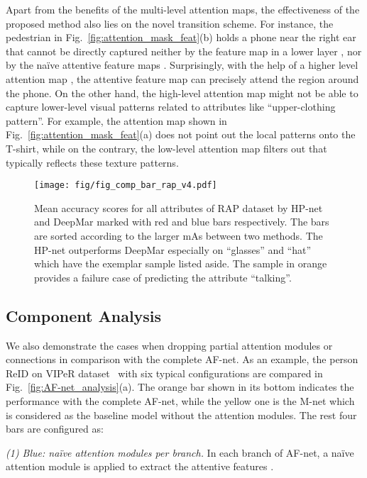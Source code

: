 \documentclass[10pt,twocolumn,letterpaper]{article}
\begin{document}
Apart from the benefits of the multi-level attention maps, the effectiveness of the proposed method also lies on the novel transition scheme.
For instance, the pedestrian in Fig.~\ref{fig:attention_mask_feat}(b) holds a phone near the right ear that cannot be directly captured neither by the feature map  in a lower layer , nor by the na\"ive attentive feature maps .
Surprisingly, with the help of a higher level attention map , the attentive feature map  can precisely attend the region around the phone.
On the other hand, the high-level attention map  might not be able to capture lower-level visual patterns related to attributes like ``upper-clothing pattern''.
For example, the attention map  shown in Fig.~\ref{fig:attention_mask_feat}(a) does not point out the local patterns onto the T-shirt, while on the contrary, the low-level attention map  filters out  that typically reflects these texture patterns.




\begin{figure*}[t]
\centering
\texttt{[image: fig/fig\_comp\_bar\_rap\_v4.pdf]}
\caption{
Mean accuracy scores for all attributes of RAP dataset by HP-net and DeepMar marked with red and blue bars respectively. The bars are sorted according to the larger mAs between two methods. The HP-net outperforms DeepMar especially on ``glasses'' and ``hat'' which have the exemplar sample listed aside. The sample in orange provides a failure case of predicting the attribute ``talking''.
}
\label{fig:comp_bar_rap}
\end{figure*}



\subsection{Component Analysis}
\label{subsec:component_analysis}

We also demonstrate the cases when dropping partial attention modules or connections in comparison with the complete AF-net.
As an example, the person ReID on VIPeR dataset~\cite{gray2007evaluating} with six typical configurations are compared in Fig.~\ref{fig:AF-net_analysis}(a).
The orange bar shown in its bottom indicates the performance with the complete AF-net, while the yellow one is the M-net which is considered as the baseline model without the attention modules.
The rest four bars are configured as:

\noindent\textit{(1) Blue: na\"ive attention modules per branch.} In each branch of AF-net, a na\"ive attention module is applied to extract the attentive features .
\end{document}
